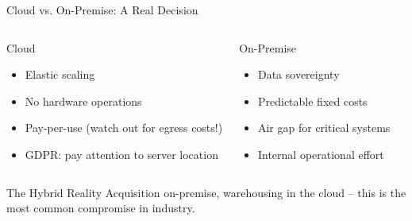 \documentclass[aspectratio=169]{beamer}
\begin{document}
\begin{frame}{Cloud vs. On-Premise: A Real Decision}
  \begin{columns}
      \begin{block}{Cloud}
        \begin{itemize}
          \item Elastic scaling
          \item No hardware operations
          \item Pay-per-use (watch out for egress costs!)
          \item GDPR: pay attention to server location
        \end{itemize}
      \end{block}
      \begin{block}{On-Premise}
        \begin{itemize}
          \item Data sovereignty
          \item Predictable fixed costs
          \item Air gap for critical systems
          \item Internal operational effort
        \end{itemize}
      \end{block}
  \end{columns}
  \vspace{0.5em}
  \begin{alertblock}{The Hybrid Reality}
    Acquisition on-premise, warehousing in the cloud – this is the most common
    compromise in industry.
  \end{alertblock}
\end{frame}
\end{document}
